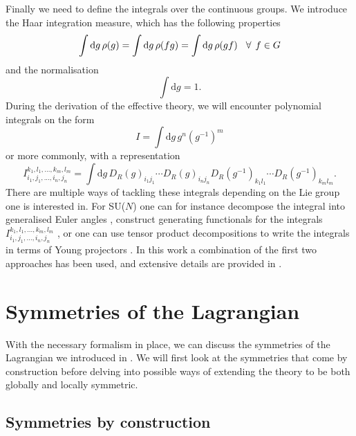 Finally we need to define the integrals over the continuous groups. We introduce
the Haar integration measure, which has the following properties
%
\begin{equation}
  \int \mathrm{d}g \, \rho(g) = \int \mathrm{d}g \, \rho(fg) 
    = \int \mathrm{d}g \, \rho(gf) \hskip2ex \forall \hskip1ex f \in G
\end{equation}
%
and the normalisation
%
\begin{equation}
  \int \mathrm{d}g = 1.
\end{equation}
%
During the derivation of the effective theory, we will encounter polynomial
integrals on the form
%
\begin{equation}
  I = \int \mathrm{d} g \, g^n (g^{-1})^m
\end{equation}
%
or more commonly, with a representation
%
\begin{equation}
  I_{i_1,j_1,...,i_n,j_n}^{k_1,l_1,...,k_m,l_m} = \int \mathrm{d} g \,
    D_R(g)_{i_1j_1} \cdots D_R(g)_{i_nj_n} D_R(g^{-1})_{k_1l_1} \cdots D_R(g^{-1})_{k_ml_m}.
\end{equation}
%
There are multiple ways of tackling these integrals depending on the Lie group
one is interested in. For SU($N$) one can for instance decompose the integral
into generalised Euler angles \citep[as described in][]{Tilma:2004kp}, construct
generating functionals for the integrals $I_{i_1,j_1,...,i_n,j_n}^{k_1,l_1,...,k_m,l_m}$
\citep[details in][]{Creutz:1978ub}, or one can use tensor product
decompositions to write the integrals in terms of Young projectors
\citep{Myers:2014dia}. In this work a combination of the first two approaches
has been used, and extensive details are provided in
.

\section{Symmetries of the Lagrangian} \label{sec:symmetries}

With the necessary formalism in place, we can discuss the symmetries of the
Lagrangian we introduced in . We will first look at the
symmetries that come by construction before delving into possible ways of
extending the theory to be both globally and locally symmetric.

\subsection{Symmetries by construction}

